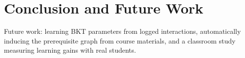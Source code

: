 \section{Conclusion and Future Work}
Future work: learning BKT parameters from logged interactions, automatically inducing the prerequisite graph from course materials, and a classroom study measuring learning gains with real students.
